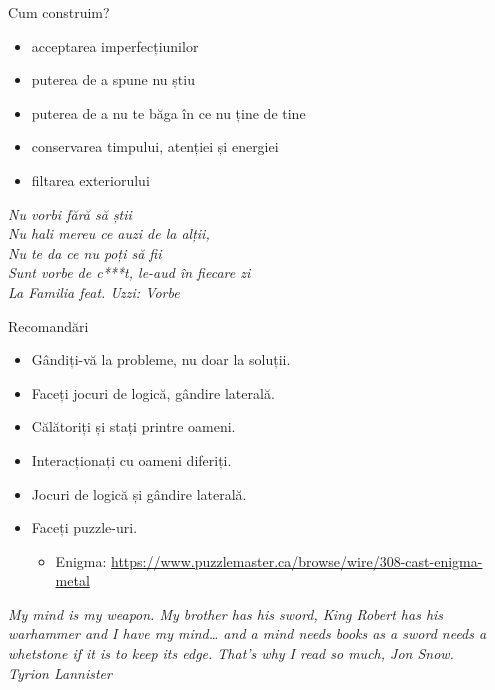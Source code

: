 \documentclass{simple}
\begin{document}
\begin{frame}{Cum construim?}
  \begin{itemize}
    \pause \item acceptarea imperfecțiunilor
    \pause \item puterea de a spune nu știu
    \pause \item puterea de a nu te băga în ce nu ține de tine
    \pause \item conservarea timpului, atenției și energiei
    \pause \item filtarea exteriorului
  \end{itemize}
  \pause
  \vspace{5mm}
  \centering
  \textit{
  Nu vorbi fără să știi \\
  Nu hali mereu ce auzi de la alții, \\
  Nu te da ce nu poți să fii \\
  Sunt vorbe de c***t, le-aud în fiecare zi \\
  }
  \vspace{3mm}
  \hfill \textit{La Familia feat. Uzzi: Vorbe}
\end{frame}

\begin{frame}{Recomandări}
  \begin{itemize}
    \pause \item Gândiți-vă la probleme, nu doar la soluții.
    \pause \item Faceți jocuri de logică, gândire laterală.
    \pause \item Călătoriți și stați printre oameni.
    \pause \item Interacționați cu oameni diferiți.
    \pause \item Jocuri de logică și gândire laterală.
    \pause \item Faceți puzzle-uri.
      \begin{itemize}
        \item Enigma: \tiny{\url{https://www.puzzlemaster.ca/browse/wire/308-cast-enigma-metal}}
      \end{itemize}
  \end{itemize}
  \pause
  \vspace{5mm}
  \centering
  \textit{My mind is my weapon. My brother has his sword, King Robert has his warhammer and I have my mind\ldots{} and a mind needs books as a sword needs a whetstone if it is to keep its edge. That's why I read so much, Jon Snow.}\\
  \vspace{3mm}
  \hfill \textit{Tyrion Lannister}
\end{frame}
\end{document}
